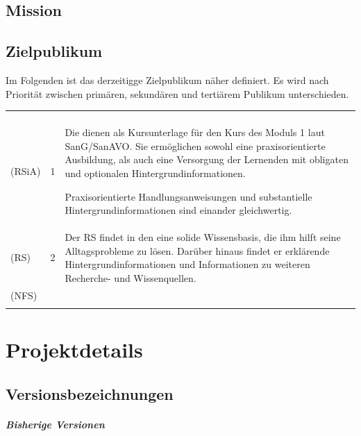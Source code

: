 \documentclass[
ngerman,
paper=a4,
asymmetric,
fontsize=10pt,
draft=false,
numbers=noenddot,
bibtotocnumbered,
footnotes=multiple,
toc=flat,
]{scrbook}
\begin{document}
    
    



\section{Mission}

\section{Zielpublikum}

Im Folgenden ist das derzeitigge Zielpublikum näher definiert. Es wird
nach Priorität zwischen primären, sekundären und tertiärem Publikum
unterschieden.

\begin{tabulary}{\linewidth}{LLL}
\toprule\addlinespace
{}
&
&
\\\addlinespace\midrule\addlinespace
{} (RSiA)
&
1
&
Die \AASS{} dienen als Kursunterlage für den Kurs des Moduls 1 laut
SanG/SanAVO. Sie ermöglichen sowohl eine praxisorientierte Ausbildung, als auch
eine Versorgung der Lernenden mit obligaten und optionalen
Hintergrundinformationen.

Praxisorientierte Handlungsanweisungen und substantielle
Hintergrundinformationen sind einander gleichwertig. 
\\\addlinespace
{} (RS) & 2
&
Der RS findet in den \AASS{} eine solide Wissensbasis, die ihm hilft seine
Alltagsprobleme zu lösen. Darüber hinaus findet er erklärende
Hintergrundinformationen und Informationen zu weiteren Recherche- und
Wissenquellen. 
\\\addlinespace {} (NFS) &

&


\\\addlinespace\bottomrule
\end{tabulary}




\chapter{Projektdetails}

\section{Versionsbezeichnungen}

\paragraph{Bisherige Versionen}~
\end{document}
